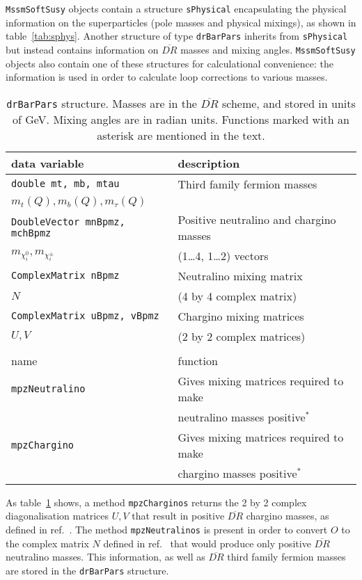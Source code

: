 \documentclass{article}
\def\code#1{\small{\tt #1}\normalsize}
\begin{document}
\code{MssmSoftSusy} objects contain a structure \code{sPhysical} encapsulating
the physical information on the superparticles (pole masses and physical
mixings), as shown in table~\ref{tab:sphys}.  
Another structure of type \code{drBarPars} inherits from \code{sPhysical} but
instead contains information on $\overline{DR}$ masses and mixing angles. 
\code{MssmSoftSusy} objects
also contain one of these structures for calculational convenience:
the information is used in order
to calculate loop corrections to various masses.
\begin{table}\begin{center}\begin{tabular}{ll} 
data variable & description \\ \hline
\code{double mt, mb, mtau} & Third family fermion masses \\
$m_t(Q), m_b(Q), m_\tau(Q)$ &                     \\ \hline
\code{DoubleVector mnBpmz, mchBpmz} & Positive neutralino and chargino masses\\
$m_{\chi_i^0}, m_{\chi^\pm_i}$ & (1\ldots4, 1\ldots2) vectors \\ \hline
\code{ComplexMatrix nBpmz} & Neutralino mixing matrix \\
$N$          & (4 by 4 complex matrix) \\ \hline
\code{ComplexMatrix uBpmz, vBpmz} & Chargino mixing matrices \\
$U, V$       & (2 by 2 complex matrices) \\ \hline
 & \\
name         & function \\ \hline
\code{mpzNeutralino} & Gives mixing matrices required to make \\ & neutralino
masses positive$^*$\\ 
\code{mpzChargino} & Gives mixing matrices required to make \\ & chargino
masses positive$^*$\\ 
\end{tabular}
\caption{\label{tab:drbarpars}\code{drBarPars} structure. Masses are in the $\overline{DR}$ scheme, and
  stored in units of GeV. Mixing angles are in radian units. Functions marked
  with an asterisk are mentioned in the text.}\end{center}\end{table}
As table~\ref{tab:drbarpars} shows, a
method \code{mpzCharginos} returns the 2 by 2 complex diagonalisation
matrices $U,V$ that result in positive $\overline{DR}$ chargino masses, as
defined in ref.~\cite{Pierce:1997zz}. 
The method
\code{mpzNeutralinos} is present in order to convert $O$ to the complex matrix
$N$ defined in ref.~\cite{Pierce:1997zz} that would produce only positive
$\overline{DR}$ neutralino masses. This information, as well as
$\overline{DR}$ third family
fermion masses are stored in the \code{drBarPars} structure.
\end{document}

